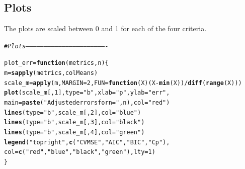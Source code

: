 \documentclass[11pt]{article}\usepackage[]{graphicx}\usepackage[]{color}
\makeatletter
\newcommand{\hlnum}[1]{\textcolor[rgb]{0.686,0.059,0.569}{#1}}%
\newcommand{\hlstr}[1]{\textcolor[rgb]{0.192,0.494,0.8}{#1}}%
\newcommand{\hlcom}[1]{\textcolor[rgb]{0.678,0.584,0.686}{\textit{#1}}}%
\newcommand{\hlopt}[1]{\textcolor[rgb]{0,0,0}{#1}}%
\newcommand{\hlstd}[1]{\textcolor[rgb]{0.345,0.345,0.345}{#1}}%
\newcommand{\hlkwa}[1]{\textcolor[rgb]{0.161,0.373,0.58}{\textbf{#1}}}%
\newcommand{\hlkwb}[1]{\textcolor[rgb]{0.69,0.353,0.396}{#1}}%
\newcommand{\hlkwc}[1]{\textcolor[rgb]{0.333,0.667,0.333}{#1}}%
\newcommand{\hlkwd}[1]{\textcolor[rgb]{0.737,0.353,0.396}{\textbf{#1}}}%
\newenvironment{kframe}{%
 \def\at@end@of@kframe{}%
 \ifinner\ifhmode%
  \def\at@end@of@kframe{\end{minipage}}%
  \begin{minipage}{\columnwidth}%
 \fi\fi%
 \def\FrameCommand##1{\hskip\@totalleftmargin \hskip-\fboxsep
 \colorbox{shadecolor}{##1}\hskip-\fboxsep
     \hskip-\linewidth \hskip-\@totalleftmargin \hskip\columnwidth}%
 \MakeFramed {\advance\hsize-\width
   \@totalleftmargin\z@ \linewidth\hsize
   \@setminipage}}%
 {\par\unskip\endMakeFramed%
 \at@end@of@kframe}
\newenvironment{knitrout}{}{} %
\makeatother
\begin{document}
\subsection{Plots}
The plots are scaled between 0 and 1 for each of the four criteria.
\begin{knitrout}
\color{fgcolor}\begin{kframe}
\begin{alltt}
\hlcom{# Plots -------------------------------------------------------------------}

\hlstd{plot_err} \hlkwb{=} \hlkwa{function}\hlstd{(}\hlkwc{metrics}\hlstd{,}\hlkwc{n}\hlstd{)\{}
  \hlstd{m} \hlkwb{=} \hlkwd{sapply}\hlstd{(metrics, colMeans)}
  \hlstd{scale_m} \hlkwb{=} \hlkwd{apply}\hlstd{(m,} \hlkwc{MARGIN} \hlstd{=} \hlnum{2}\hlstd{,} \hlkwc{FUN} \hlstd{=} \hlkwa{function}\hlstd{(}\hlkwc{X}\hlstd{) (X} \hlopt{-} \hlkwd{min}\hlstd{(X))}\hlopt{/}\hlkwd{diff}\hlstd{(}\hlkwd{range}\hlstd{(X)))}
  \hlkwd{plot}\hlstd{(scale_m[,}\hlnum{1}\hlstd{],}\hlkwc{type}\hlstd{=}\hlstr{"b"}\hlstd{,}\hlkwc{xlab}\hlstd{=}\hlstr{"p"}\hlstd{,}\hlkwc{ylab}\hlstd{=}\hlstr{"err"}\hlstd{,}
       \hlkwc{main}\hlstd{=}\hlkwd{paste}\hlstd{(}\hlstr{"Adjusted errors for n ="}\hlstd{,n),} \hlkwc{col}\hlstd{=}\hlstr{"red"}\hlstd{)}
  \hlkwd{lines}\hlstd{(}\hlkwc{type}\hlstd{=}\hlstr{"b"}\hlstd{,scale_m[,}\hlnum{2}\hlstd{],}\hlkwc{col}\hlstd{=}\hlstr{"blue"}\hlstd{)}
  \hlkwd{lines}\hlstd{(}\hlkwc{type}\hlstd{=}\hlstr{"b"}\hlstd{,scale_m[,}\hlnum{3}\hlstd{],}\hlkwc{col}\hlstd{=}\hlstr{"black"}\hlstd{)}
  \hlkwd{lines}\hlstd{(}\hlkwc{type}\hlstd{=}\hlstr{"b"}\hlstd{,scale_m[,}\hlnum{4}\hlstd{],}\hlkwc{col}\hlstd{=}\hlstr{"green"}\hlstd{)}
  \hlkwd{legend}\hlstd{(}\hlstr{"topright"}\hlstd{,}\hlkwd{c}\hlstd{(}\hlstr{"CV MSE"}\hlstd{,}\hlstr{"AIC"}\hlstd{,}\hlstr{"BIC"}\hlstd{,}\hlstr{"Cp"}\hlstd{),}
         \hlkwc{col}\hlstd{=}\hlkwd{c}\hlstd{(}\hlstr{"red"}\hlstd{,}\hlstr{"blue"}\hlstd{,}\hlstr{"black"}\hlstd{,}\hlstr{"green"}\hlstd{),}\hlkwc{lty}\hlstd{=}\hlnum{1}\hlstd{)}
\hlstd{\}}


\end{alltt}
\end{kframe}
\end{knitrout}
\end{document}
